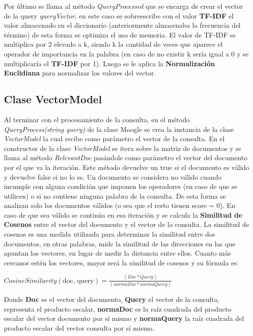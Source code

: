 \documentclass{article}
\begin{document}
Por último se llama al método \textit{QueryProcessed} que se encarga de crear el vector de la query \textit{queryVector}, en este caso se sobreescribe con el valor \textbf{TF-IDF} el valor almacenado en el diccionario (anteriormente almacenaba la frecuencia del término) de esta forma se optimiza el uso de memoria. El valor de TF-IDF se multiplica por 2 elevado a k, siendo k la cantidad de veces que aparece el operador de importancia en la palabra (en caso de no existir k sería igual a 0 y se multiplicaría el \textbf{TF-IDF} por 1). Luego se le aplica la \textbf{Normalización Euclidiana} para normalizar los valores del vector.

\subsection{Clase VectorModel}

Al terminar con el procesamiento de la consulta, en el método \textit{QueryProcess(string query)} de la clase Moogle se crea la instancia de la clase \textit{VectorModel} la cual recibe como parámetro el vector de la consulta. En el constructor de la clase \textit{VectorModel} se itera sobre la matriz de documentos y se llama al método \textit{RelevantDoc} pasándole como parámetro el vector del documento por el que va la iteración. Este método devuelve un true si el documento es válido y devuelve false si no lo es. Un documento se
considera no válido cuando incumple con alguna condición que imponen los operadores (en caso de que se utilicen) o si no contiene ninguna palabra de la consulta. De esta forma se analizan solo los documentos válidos (o sea que el resto tienen score = 0). En caso de que sea válido se continúa en esa iteración y se calcula la \textbf{Similitud de Cosenos} entre el vector del documento y el vector de la consulta. La similitud de cosenos es una medida utilizada para determinar la
similitud entre dos documentos, en otras palabras, mide la similitud de las direcciones en las que apuntan los vectores, en lugar de medir la distancia entre ellos. Cuanto más cercanos estén los vectores, mayor será la similitud de cosenos y su fórmula es:

\vspace{0.3cm}
$Cosine Similarity(\text{doc, query}) = \frac{(Doc * Query)}{(normaDoc * normaQuery)}$
\newline

Donde \textbf{Doc} es el vector del documento, \textbf{Query} el vector de la consulta, \* representa el producto escalar, \textbf{normaDoc} es la raíz cuadrada del producto escalar del vector documento por sí mismo y \textbf{normaQuery} la raíz cuadrada del producto escalar del vector consulta por sí mismo.
\newline
\end{document}
